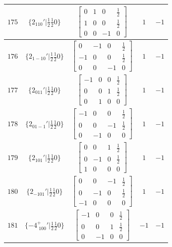 \documentclass[fleqn,8pt]{jsarticle}
\begin{document}
\begin{longtable}{ccccc}
$ 175 $ & $ \{2{}_{110}{}'|\frac{1}{2} \frac{1}{2} 0\} $ & $ \begin{bmatrix} 0 & 1 & 0 & \frac{1}{2} \\ 1 & 0 & 0 & \frac{1}{2} \\ 0 & 0 & -1 & 0 \end{bmatrix} $ & $ 1 $ & $ -1 $ \\ \hline
$ 176 $ & $ \{2{}_{1-10}{}'|\frac{1}{2} \frac{1}{2} 0\} $ & $ \begin{bmatrix} 0 & -1 & 0 & \frac{1}{2} \\ -1 & 0 & 0 & \frac{1}{2} \\ 0 & 0 & -1 & 0 \end{bmatrix} $ & $ 1 $ & $ -1 $ \\ \hline
$ 177 $ & $ \{2{}_{011}{}'|\frac{1}{2} \frac{1}{2} 0\} $ & $ \begin{bmatrix} -1 & 0 & 0 & \frac{1}{2} \\ 0 & 0 & 1 & \frac{1}{2} \\ 0 & 1 & 0 & 0 \end{bmatrix} $ & $ 1 $ & $ -1 $ \\ \hline
$ 178 $ & $ \{2{}_{01-1}{}'|\frac{1}{2} \frac{1}{2} 0\} $ & $ \begin{bmatrix} -1 & 0 & 0 & \frac{1}{2} \\ 0 & 0 & -1 & \frac{1}{2} \\ 0 & -1 & 0 & 0 \end{bmatrix} $ & $ 1 $ & $ -1 $ \\ \hline
$ 179 $ & $ \{2{}_{101}{}'|\frac{1}{2} \frac{1}{2} 0\} $ & $ \begin{bmatrix} 0 & 0 & 1 & \frac{1}{2} \\ 0 & -1 & 0 & \frac{1}{2} \\ 1 & 0 & 0 & 0 \end{bmatrix} $ & $ 1 $ & $ -1 $ \\ \hline
$ 180 $ & $ \{2{}_{-101}{}'|\frac{1}{2} \frac{1}{2} 0\} $ & $ \begin{bmatrix} 0 & 0 & -1 & \frac{1}{2} \\ 0 & -1 & 0 & \frac{1}{2} \\ -1 & 0 & 0 & 0 \end{bmatrix} $ & $ 1 $ & $ -1 $ \\ \hline
$ 181 $ & $ \{-4^{+}_{\,\,100}{}'|\frac{1}{2} \frac{1}{2} 0\} $ & $ \begin{bmatrix} -1 & 0 & 0 & \frac{1}{2} \\ 0 & 0 & 1 & \frac{1}{2} \\ 0 & -1 & 0 & 0 \end{bmatrix} $ & $ -1 $ & $ -1 $ \\ \hline

\end{longtable}
\end{document}
